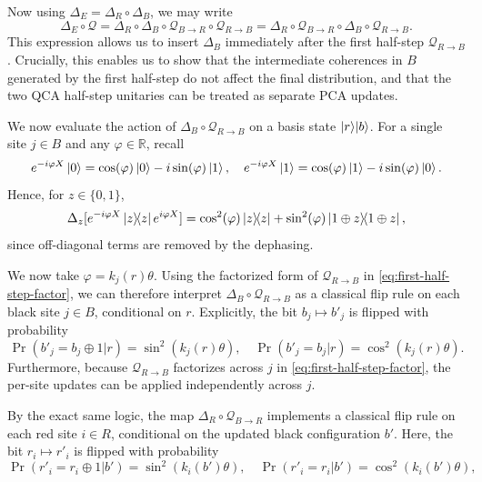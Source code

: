 \documentclass[
    aps,
    prx,
    reprint,
    superscriptaddress,
    longbibliography,
    nofootinbib,
    floatfix,
]{revtex4-2}
\newcommand{\ketbra}[2]{\ket{#1}\!\!\bra{#2}}  %
\begin{document}
Now using \(\Delta_E = \Delta_R \circ \Delta_B\), we may write
\begin{equation}\label{eq:maps-commutation}
    \Delta_E \circ \mathcal{Q} = \Delta_R \circ \Delta_B \circ \mathcal{Q}_{B \to R} \circ \mathcal{Q}_{R \to B} = \Delta_R \circ \mathcal{Q}_{B \to R} \circ \Delta_B \circ \mathcal{Q}_{R \to B}.
\end{equation}
This expression allows us to insert \(\Delta_B\) immediately after the first half-step \(\mathcal{Q}_{R \to B}\). Crucially, this enables us to show that the intermediate coherences in \(B\) generated by the first half-step do not affect the final distribution, and that the two QCA half-step unitaries can be treated as separate PCA updates.

We now evaluate the action of \(\Delta_B \circ \mathcal{Q}_{R \to B}\) on a basis state \(\ket{r}\!\ket{b}\). For a single site \(j \in B\) and any \(\varphi \in \mathbb{R}\), recall
\begin{equation}
    e^{-i\varphi X} \ket{0} = \cos(\varphi) \ket{0} - i \sin(\varphi) \ket{1}, \quad
    e^{-i\varphi X} \ket{1} = \cos(\varphi) \ket{1} - i \sin(\varphi) \ket{0}.
\end{equation}
Hence, for \(z \in \{0,1\}\),
\begin{equation}
    \Delta_z[e^{-i\varphi X} \ketbra{z}{z} e^{i\varphi X}] = \cos^2(\varphi) \ketbra{z}{z} + \sin^2(\varphi) \ketbra{1\oplus z}{1\oplus z},
\end{equation}
since off-diagonal terms are removed by the dephasing.

We now take \(\varphi = k_j(r) \theta\). Using the factorized form of \(\mathcal{Q}_{R \to B}\) in \cref{eq:first-half-step-factor}, we can therefore interpret \(\Delta_B \circ \mathcal{Q}_{R \to B}\) as a classical flip rule on each black site \(j\in B\), conditional on \(r\). Explicitly, the bit \(b_j \mapsto b'_j\) is flipped with probability
\begin{equation}
    \Pr(b'_j = b_j \oplus 1 | r) = \sin^2(k_j(r) \theta), \quad
    \Pr(b'_j = b_j | r) = \cos^2(k_j(r) \theta).
\end{equation}
Furthermore, because \(\mathcal{Q}_{R \to B}\) factorizes across \(j\) in \cref{eq:first-half-step-factor}, the per-site updates can be applied independently across \(j\).

By the exact same logic, the map \(\Delta_R \circ \mathcal{Q}_{B \to R}\) implements a classical flip rule on each red site \(i \in R\), conditional on the updated black configuration \(b'\). Here, the bit \(r_i \mapsto r'_i\) is flipped with probability
\begin{equation}
    \Pr(r'_i = r_i \oplus 1 | b') = \sin^2(k_i(b') \theta), \quad
    \Pr(r'_i = r_i | b') = \cos^2(k_i(b') \theta),
\end{equation}
\end{document}
